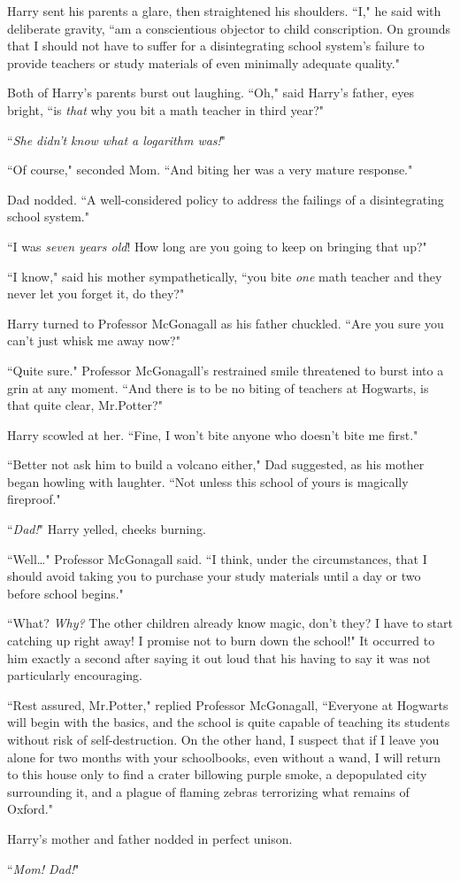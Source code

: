 Harry sent his parents a glare, then straightened his shoulders. ``I," he said with deliberate gravity, ``am a conscientious objector to child conscription. On grounds that I should not have to suffer for a disintegrating school system's failure to provide teachers or study materials of even minimally adequate quality."

Both of Harry's parents burst out laughing. ``Oh," said Harry's father, eyes bright, ``is \emph{that} why you bit a math teacher in third year?"

``\emph{She didn't know what a logarithm was!}"

``Of course," seconded Mom. ``And biting her was a very mature response."

Dad nodded. ``A well-considered policy to address the failings of a disintegrating school system."

``I was \emph{seven years old}! How long are you going to keep on bringing that up?"

``I know," said his mother sympathetically, ``you bite \emph{one} math teacher and they never let you forget it, do they?"

Harry turned to Professor McGonagall as his father chuckled. ``Are you sure you can't just whisk me away now?"

``Quite sure." Professor McGonagall's restrained smile threatened to burst into a grin at any moment. ``And there is to be no biting of teachers at Hogwarts, is that quite clear, Mr.\?Potter?"

Harry scowled at her. ``Fine, I won't bite anyone who doesn't bite me first."

``Better not ask him to build a volcano either," Dad suggested, as his mother began howling with laughter. ``Not unless this school of yours is magically fireproof."

``\emph{Dad!}" Harry yelled, cheeks burning.

``Well{\ldots}" Professor McGonagall said. ``I think, under the circumstances, that I should avoid taking you to purchase your study materials until a day or two before school begins."

``What? \emph{Why?} The other children already know magic, don't they? I have to start catching up right away! I promise not to burn down the school!" It occurred to him exactly a second after saying it out loud that his having to say it was not particularly encouraging.

``Rest assured, Mr.\?Potter," replied Professor McGonagall, ``Everyone at Hogwarts will begin with the basics, and the school is quite capable of teaching its students without risk of self-destruction. On the other hand, I suspect that if I leave you alone for two months with your schoolbooks, even without a wand, I will return to this house only to find a crater billowing purple smoke, a depopulated city surrounding it, and a plague of flaming zebras terrorizing what remains of Oxford."

Harry's mother and father nodded in perfect unison.

``\emph{Mom! Dad!}"

